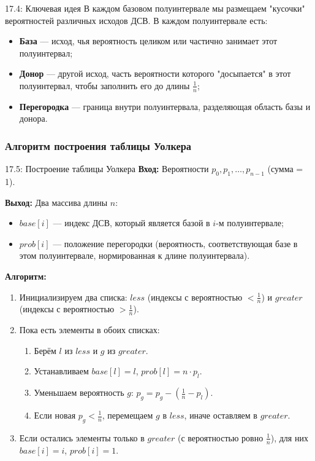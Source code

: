 \documentclass[a4paper,12pt]{article}
\begin{document}
	\begin{remarkbox}{17.4: Ключевая идея}
		В каждом базовом полуинтервале мы размещаем "кусочки" вероятностей различных исходов ДСВ. В каждом полуинтервале есть:
		\begin{itemize}
			\item \textbf{База} — исход, чья вероятность целиком или частично занимает этот полуинтервал;
			\item \textbf{Донор} — другой исход, часть вероятности которого "досыпается" в этот полуинтервал, чтобы заполнить его до длины \(\frac{1}{n}\);
			\item \textbf{Перегородка} — граница внутри полуинтервала, разделяющая область базы и донора.
		\end{itemize}
	\end{remarkbox}
	
	\subsubsection{Алгоритм построения таблицы Уолкера}
	
	\begin{algorithmbox}{17.5: Построение таблицы Уолкера}
		\textbf{Вход:} Вероятности \(p_0, p_1, \dots, p_{n-1}\) (сумма = 1).
		
		\textbf{Выход:} Два массива длины \(n\):
		\begin{itemize}
			\item \(base[i]\) — индекс ДСВ, который является базой в \(i\)-м полуинтервале;
			\item \(prob[i]\) — положение перегородки (вероятность, соответствующая базе в этом полуинтервале, нормированная к длине полуинтервала).
		\end{itemize}
		
		\textbf{Алгоритм:}
		\begin{enumerate}
			\item Инициализируем два списка: \(less\) (индексы с вероятностью \(< \frac{1}{n}\)) и \(greater\) (индексы с вероятностью \(> \frac{1}{n}\)).
			\item Пока есть элементы в обоих списках:
			\begin{enumerate}
				\item Берём \(l\) из \(less\) и \(g\) из \(greater\).
				\item Устанавливаем \(base[l] = l\), \(prob[l] = n \cdot p_l\).
				\item Уменьшаем вероятность \(g\): \(p_g = p_g - (\frac{1}{n} - p_l)\).
				\item Если новая \(p_g < \frac{1}{n}\), перемещаем \(g\) в \(less\), иначе оставляем в \(greater\).
			\end{enumerate}
			\item Если остались элементы только в \(greater\) (с вероятностью ровно \(\frac{1}{n}\)), для них \(base[i] = i\), \(prob[i] = 1\).
		\end{enumerate}
	\end{algorithmbox}
	
\end{document}
